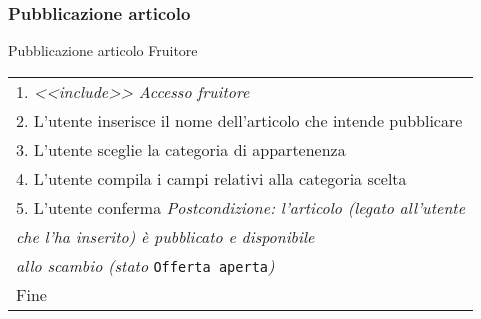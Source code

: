 \begin{minipage}{\textwidth}
    \subsubsection{Pubblicazione articolo}
    \usecase
        {Pubblicazione articolo}
        {
            Fruitore %
        }
        {
            \begin{tabular}{l}
                1. \textit{<<include>> Accesso fruitore}\\
                2. L'utente inserisce il nome dell'articolo che intende pubblicare\\
                3. L'utente sceglie la categoria di appartenenza\\
                4. L'utente compila i campi relativi alla categoria scelta\\
                5. L'utente conferma
                \textit{Postcondizione: l'articolo (legato all'utente}\\
                \textit{che l'ha inserito) è pubblicato e disponibile}\\
                \textit{allo scambio (stato }\texttt{Offerta aperta}\textit{)}\\
                Fine
            \end{tabular}\\

            \\

            \\


        }
        \vspace{0.5cm}
\end{minipage}